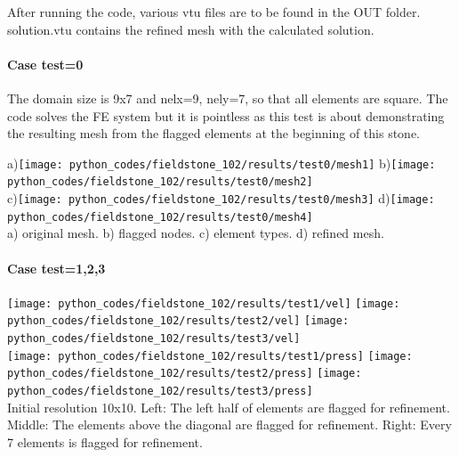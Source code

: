 After running the code, various vtu files are to be found in the OUT folder.
{\filenamefont solution.vtu} contains the refined mesh with the calculated 
solution. 

\newpage
\paragraph{Case test=0}

The domain size is 9x7 and nelx=9, nely=7, so that all elements are square. 
The code solves the FE system but it is pointless as this test is about demonstrating 
the resulting mesh from the flagged elements at the beginning of this stone. 

\begin{center}
a)\texttt{[image: python\_codes/fieldstone\_102/results/test0/mesh1]}
b)\texttt{[image: python\_codes/fieldstone\_102/results/test0/mesh2]}\\
c)\texttt{[image: python\_codes/fieldstone\_102/results/test0/mesh3]}
d)\texttt{[image: python\_codes/fieldstone\_102/results/test0/mesh4]}\\
{\captionfont a) original mesh. b) flagged nodes. c) element types. d) refined mesh.}
\end{center}

\paragraph{Case test=1,2,3}

\begin{center}
\texttt{[image: python\_codes/fieldstone\_102/results/test1/vel]}
\texttt{[image: python\_codes/fieldstone\_102/results/test2/vel]}
\texttt{[image: python\_codes/fieldstone\_102/results/test3/vel]}\\
\texttt{[image: python\_codes/fieldstone\_102/results/test1/press]}
\texttt{[image: python\_codes/fieldstone\_102/results/test2/press]}
\texttt{[image: python\_codes/fieldstone\_102/results/test3/press]}\\
{\captionfont Initial resolution 10x10. 
Left: The left half of elements are flagged for refinement.
Middle: The elements above the diagonal are flagged for refinement.
Right: Every 7 elements is flagged for refinement.}
\end{center}

















